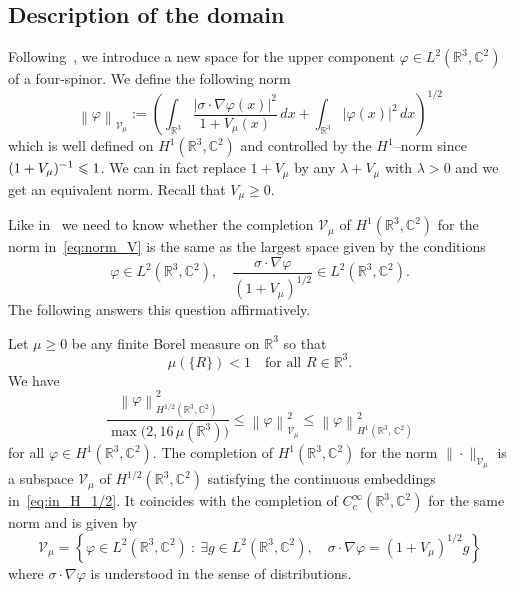 \documentclass[AHL,Unicode,published]{cedram}
\newcommand{\R}{\mathbb{R}}
\newcommand{\C}{\mathbb{C}}
\newcommand{\cV}{\mathcal{V}}
\newcommand\1{{\ensuremath {\mathds 1} }}
\renewcommand\phi{\varphi}
\newcommand{\ii}{\infty}
\newcommand{\norm}[1]{ \left\| #1 \right\|}
\renewcommand{\geq}{\geqslant}
\renewcommand{\leq}{\leqslant}
\let\oldexists\exists
\renewcommand*{\exists}{\mathrel{\oldexists}}
\begin{document}
\subsection{Description of the domain}
Following~\cite{EstLewSer-19}, we introduce a new space for the upper component $\phi\in L^2(\R^3,\C^2)$ of a four-spinor. We define the following norm
\begin{equation}\label{eq:norm_V}
\norm{\phi}_{\cV_\mu}:= \left(\int_{\R^3}\frac{\left|\sigma\cdot \nabla\phi(x)\right|^2}{1+V_\mu(x)}\,dx+\int_{\R^3}\left|\phi(x)\right|^2\,dx\right)^{1/2}
\end{equation}
which is well defined on $H^1(\R^3,\C^2)$ and controlled by the $H^1$--norm since $(1+V_\mu)^{-1}\linebreak\leq1$. We can in fact replace $1+V_\mu$ by any $\lambda+V_\mu$ with $\lambda>0$ and we get an equivalent norm. Recall that $V_\mu\geq0$.

Like in~\cite{EstLewSer-19} we need to know whether the completion $\cV_\mu$ of $H^1(\R^3,\C^2)$ for the norm in~\eqref{eq:norm_V} is the same as the largest space given by the conditions
\[
\phi\in L^2\left(\R^3,\C^2\right),\quad \frac{\sigma\cdot \nabla\phi}{\left(1+V_\mu\right)^{1/2}}\in L^2\left(\R^3,\C^2\right).
\]
The following answers this question affirmatively.

\begin{theo}[The upper-spinor space $\cV_\mu$]\label{thm:def_cV_mu}
Let $\mu\geq0$ be any finite Borel measure on $\R^3$ so that
\[
\mu(\{R\})<1\quad \text{for all }R\in\R^3.
\]
We have
\begin{equation}\label{eq:in_H_1/2}
\frac{\norm{\phi}^2_{H^{1/2}\left(\R^3,\C^2\right)}}{\max\big(2,16\,\mu\left(\R^3\right)\big)}\leq \norm{\phi}^2_{\cV_\mu}\leq \norm{\phi}^2_{H^{1}\left(\R^3,\,\C^2\right)}
\end{equation}
for all $\phi\in H^1(\R^3,\C^2)$. The completion of $H^1(\R^3,\C^2)$ for the norm $\|\cdot\|_{\cV_\mu}$ is a subspace $\cV_\mu$ of $H^{1/2}(\R^3,\C^2)$ satisfying the continuous embeddings in~\eqref{eq:in_H_1/2}. It coincides with the completion of $C^\ii_c(\R^3,\C^2)$ for the same norm and is given by
\begin{equation}\label{eq:cV_mu_maximal}
\cV_\mu=\left\{\phi\in L^2\left(\R^3,\C^2\right)\ :\ \exists g\in L^2\left(\R^3,\C^2\right),\quad \sigma\cdot \nabla\phi=\left(1+V_\mu\right)^{1/2}g\right\}
\end{equation}
where $\sigma\cdot \nabla\phi$ is understood in the sense of distributions.
\end{theo}
\end{document}

